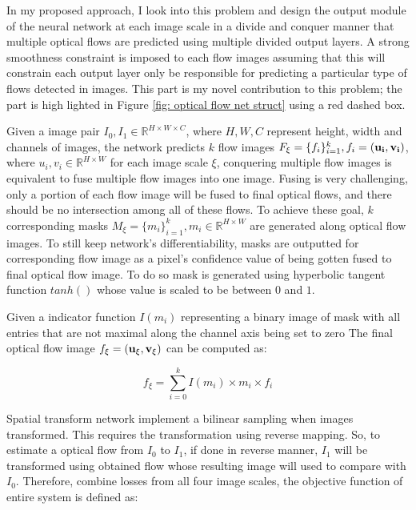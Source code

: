 \documentclass{iitthesis}
\begin{document}
In my proposed approach, I look into this problem and design the output module of the neural network at each image scale in a divide and conquer manner that multiple optical flows are predicted using multiple divided output layers. A strong smoothness constraint is imposed to each flow images assuming that this will constrain each output layer only be responsible for predicting a particular type of flows detected in images. This part is my novel contribution to this problem; the part is high lighted in Figure \ref{fig: optical flow net struct} using a red dashed box.

Given a image pair $I_0, I_1\in \mathbb{R}^{H\times W\times C}$, where $H, W, C$ represent height, width and channels of images, the network predicts $k$ flow images $F_{\xi}= \{f_i\}_{i=1}^k, f_i = (\bold{u_i}, \bold{v_i})$, where $u_i, v_i\in \mathbb{R}^{H\times W}$ for each image scale $\xi$, conquering multiple flow images is equivalent to fuse multiple flow images into one image. Fusing is very challenging, only a portion of each flow image will be fused to final optical flows, and there should be no intersection among all of these flows. To achieve these goal, $k$ corresponding masks $M_{\xi}=\{m_i\}_{i=1}^k, m_i \in \mathbb{R}^{H\times W}$ are generated along optical flow images. To still keep network's differentiability, masks are outputted for corresponding flow image as a pixel's confidence value of being gotten fused to final optical flow image. To do so mask is generated using hyperbolic tangent function $tanh()$ whose value is scaled to be between $0$ and $1$. 

Given a indicator function $I(m_i)$ representing a binary image of mask with all entries that are not maximal along the channel axis being set to zero The final optical flow image $f_{\xi}=(\bold{u}_{\xi}, \bold{v}_{\xi})$ can be computed as:

\begin{equation}
\label{eqn: fuse optical flow}
f_{\xi} = \sum_{i=0}^k I(m_i)\times m_i \times f_i
\end{equation} 

Spatial transform network \cite{NIPS2015_5854} implement a bilinear sampling when images transformed. This requires the transformation using reverse mapping. So, to estimate a optical flow from $I_0$ to $I_1$, if done in reverse manner, $I_1$ will be transformed using obtained flow whose resulting image will used to compare with $I_0$. Therefore, combine losses from all four image scales, the objective function of entire system is defined as:
\end{document}
